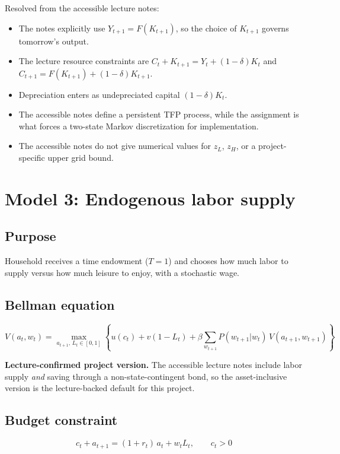 \documentclass[11pt]{article}
\begin{document}
\begin{warningbox}
Resolved from the accessible lecture notes:
\begin{itemize}
    \item The notes explicitly use $Y_{t+1} = F(K_{t+1})$, so the choice of $K_{t+1}$ governs tomorrow's output.
    \item The lecture resource constraints are $C_t + K_{t+1} = Y_t + (1-\delta)K_t$ and $C_{t+1} = F(K_{t+1}) + (1-\delta)K_{t+1}$.
    \item Depreciation enters as undepreciated capital $(1-\delta)K_t$.
    \item The accessible notes define a persistent TFP process, while the assignment is what forces a two-state Markov discretization for implementation.
    \item The accessible notes do not give numerical values for $z_L$, $z_H$, or a project-specific upper grid bound.
\end{itemize}
\end{warningbox}

\bigskip
\section{Model 3: Endogenous labor supply}

\subsection{Purpose}
Household receives a time endowment ($T=1$) and chooses how much labor to supply versus how much leisure to enjoy, with a stochastic wage.

\subsection{Bellman equation}
\[
V(a_t,w_t) = \max_{a_{t+1},\,L_t \in [0,1]} \left\{ u(c_t) + v(1-L_t) + \beta \sum_{w_{t+1}} P(w_{t+1}|w_t)\,V(a_{t+1},w_{t+1}) \right\}
\]

\begin{warningbox}
\textbf{Lecture-confirmed project version.} The accessible lecture notes include labor supply \emph{and} saving through a non-state-contingent bond, so the asset-inclusive version is the lecture-backed default for this project.
\end{warningbox}

\subsection{Budget constraint}
\[
c_t + a_{t+1} = (1+r_t)\,a_t + w_t L_t, \qquad c_t > 0
\]
\end{document}
